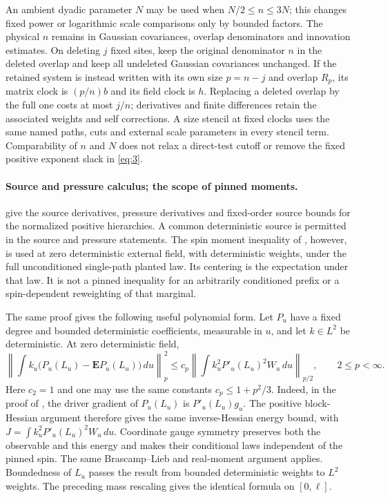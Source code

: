 An ambient dyadic parameter $N$ may be used when $N/2\le n\le3N$;
this changes fixed power or logarithmic scale comparisons only by
bounded factors. The physical $n$ remains in Gaussian covariances,
overlap denominators and innovation estimates. On deleting $j$ fixed
sites, keep the original denominator $n$ in the deleted overlap and
keep all undeleted Gaussian covariances unchanged. If the retained
system is instead written with its own size $p=n-j$ and overlap
$R_p$, its matrix clock is $(p/n)b$ and its field clock is $h$.
Replacing a deleted overlap by the full one costs at most $j/n$;
derivatives and finite differences retain the associated weights and
self corrections. A size stencil at fixed clocks uses the same named
paths, cuts and external scale parameters in every stencil term.
Comparability of $n$ and $N$ does not relax a direct-test cutoff or
remove the fixed positive exponent slack in \eqref{eq:3}.

\paragraph{Source and pressure calculus; the scope of pinned moments.}
give the source derivatives, pressure derivatives and fixed-order
source bounds for the normalized positive hierarchies. A common
deterministic source is permitted in the source and pressure
statements. The spin moment inequality of
, however, is used at zero deterministic
external field, with deterministic weights, under the full
unconditioned single-path planted law. Its centering is the expectation
under that law. It is not a pinned inequality for an arbitrarily
conditioned prefix or a spin-dependent reweighting of that marginal.

The same proof gives the following useful polynomial form. Let $P_u$
have a fixed degree and bounded deterministic coefficients, measurable
in $u$, and let $k\in L^2$ be deterministic. At zero deterministic field,
\[
 \left\|\int k_u\bigl(P_u(L_u)-\mathbf E P_u(L_u)\bigr)\,du\right\|_p^2
 \le c_p\left\|\int k_u^2P'_u(L_u)^2W_u\,du\right\|_{p/2},
 \qquad 2\le p<\infty.
\]
Here $c_2=1$ and one may use the same constants $c_p\le1+p^2/3$.
Indeed, in the proof of , the driver gradient
of $P_u(L_u)$ is $P'_u(L_u)g_u$. The positive block-Hessian argument
therefore gives the same inverse-Hessian energy bound, with
$J=\int k_u^2P'_u(L_u)^2W_u\,du$. Coordinate gauge symmetry preserves
both the observable and this energy and makes their conditional laws
independent of the pinned spin. The same Brascamp--Lieb and
real-moment argument applies. Boundedness of $L_u$ passes the result
from bounded deterministic weights to $L^2$ weights. The preceding
mass rescaling gives the identical formula on $[0,\ell]$.

